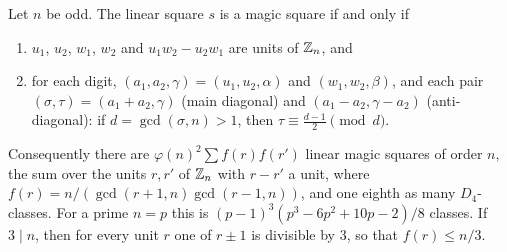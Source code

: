 \begin{proposition}
\label{prop:linear-magic}
Let $n$ be odd. The linear square $s$ is a magic square if and only if
\begin{enumerate}
\item[(a)] $u_1$, $u_2$, $w_1$, $w_2$ and $u_1w_2-u_2w_1$ are units of $\mathbb{Z}_n$, and
\item[(b)] for each digit, $(a_1,a_2,\gamma)=(u_1,u_2,\alpha)$ and $(w_1,w_2,\beta)$, and each pair $(\sigma,\tau)=(a_1+a_2,\gamma)$ (main diagonal) and $(a_1-a_2,\gamma-a_2)$ (anti-diagonal): if $d=\gcd(\sigma,n)>1$, then $\tau\equiv\frac{d-1}2\pmod d$.
\end{enumerate}
Consequently there are $\varphi(n)^2\sum f(r)f(r')$ linear magic squares of order $n$, the sum over the units $r,r'$ of $\mathbb{Z}_n$ with $r-r'$ a unit, where $f(r)=n/(\gcd(r+1,n)\gcd(r-1,n))$, and one eighth as many $D_4$-classes.
For a prime $n=p$ this is $(p-1)^3(p^3-6p^2+10p-2)/8$ classes.
If $3\mid n$, then for every unit $r$ one of $r\pm1$ is divisible by $3$, so that $f(r)\le n/3$.
\end{proposition}

